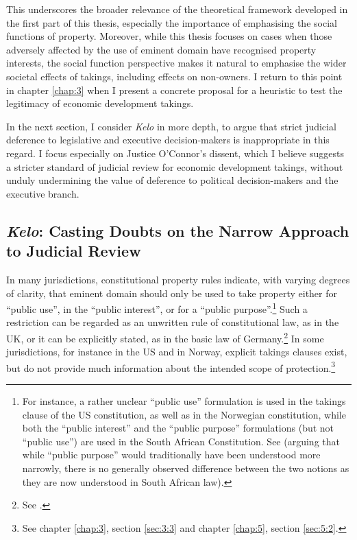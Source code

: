 This underscores the broader relevance of the theoretical framework developed in the first part of this thesis, especially the importance of emphasising the social functions of property. Moreover, while this thesis focuses on cases when those adversely affected by the use of eminent domain have recognised property interests, the social function perspective makes it natural to emphasise the wider societal effects of takings, including effects on non-owners. I return to this point in chapter \ref{chap:3} when I present a concrete proposal for a heuristic to test the legitimacy of economic development takings.

In the next section, I consider {\it Kelo} in more depth, to argue that strict judicial deference to legislative and executive decision-makers is inappropriate in this regard. I focus especially on Justice O'Connor's dissent, which I believe suggests a stricter standard of judicial review for economic development takings, without unduly undermining the value of deference to political decision-makers and the executive branch.

\subsection{{\it Kelo}: Casting Doubts on the Narrow Approach to Judicial Review}\label{sec:2:6:1}

In many jurisdictions, constitutional property rules indicate, with varying degrees of clarity, that eminent domain should only be used to take property either for ``public use'', in the ``public interest'', or for a ``public purpose''.\footnote{For instance, a rather unclear ``public use'' formulation is used in the takings clause of the US constitution, as well as in the Norwegian constitution, while both the ``public interest'' and the ``public purpose'' formulations (but not ``public use'') are used in the South African Constitution. See \cite[462]{walt11} (arguing that while ``public purpose'' would traditionally have been understood more narrowly, there is no generally observed difference between the two notions as they are now understood in South African law).} Such a restriction can be regarded as an unwritten rule of constitutional law, as in the UK, or it can be explicitly stated, as in the basic law of Germany.\footnote{See \cite[3-4]{sluysmans15}.} In some jurisdictions, for instance in the US and in Norway, explicit takings clauses exist, but do not provide much information about the intended scope of protection.\footnote{See chapter \ref{chap:3}, section \ref{sec:3:3} and chapter \ref{chap:5}, section \ref{sec:5:2}.}


